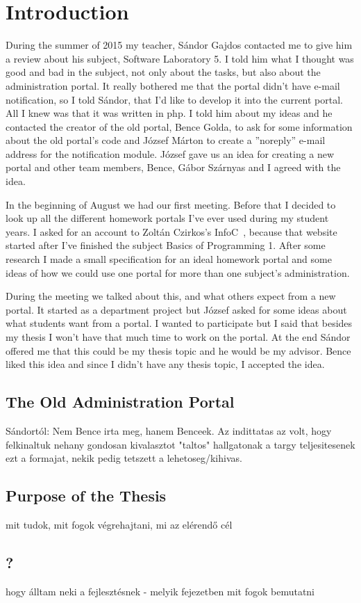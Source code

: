 \chapter{Introduction}

During the summer of 2015 my teacher, Sándor Gajdos contacted me to give him a review about his subject, Software Laboratory 5. I told him what I thought was good and bad in the subject, not only about the tasks, but also about the administration portal. It really bothered me that the portal didn't have e-mail notification, so I told Sándor, that I'd like to develop it into the current portal. All I knew was that it was written in php. I told him about my ideas and he contacted the creator of the old portal, Bence Golda, to ask for some information about the old portal's code and József Márton to create a ''noreply'' e-mail address for the notification module. József gave us an idea for creating a new portal and other team members, Bence, Gábor Szárnyas and I agreed with the idea. 

In the beginning of August we had our first meeting. Before that I decided to look up all the different homework portals I've ever used during my student years. I asked for an account to Zoltán Czirkos's InfoC~\cite{InfoC}, because that website started after I've finished the subject Basics of Programming 1. After some research I made a small specification for an ideal homework portal and some ideas of how we could use one portal for more than one subject's administration.

During the meeting we talked about this, and what others expect from a new portal. It started as a department project but József asked for some ideas about what students want from a portal. I wanted to participate but I said that besides my thesis I won't have that much time to work on the portal. At the end Sándor offered me that this could be my thesis topic and he would be my advisor. Bence liked this idea and since I didn't have any thesis topic, I accepted the idea.

\section{The Old Administration Portal} 
Sándortól: Nem Bence irta meg, hanem Benceek. Az indittatas az volt, hogy felkinaltuk nehany gondosan kivalasztot "taltos" hallgatonak a targy teljesitesenek ezt a formajat, nekik pedig tetszett a lehetoseg/kihivas.

\section{Purpose of the Thesis}
mit tudok, mit fogok végrehajtani, mi az elérendő cél

\section{?}
hogy álltam neki a fejlesztésnek - melyik fejezetben mit fogok bemutatni